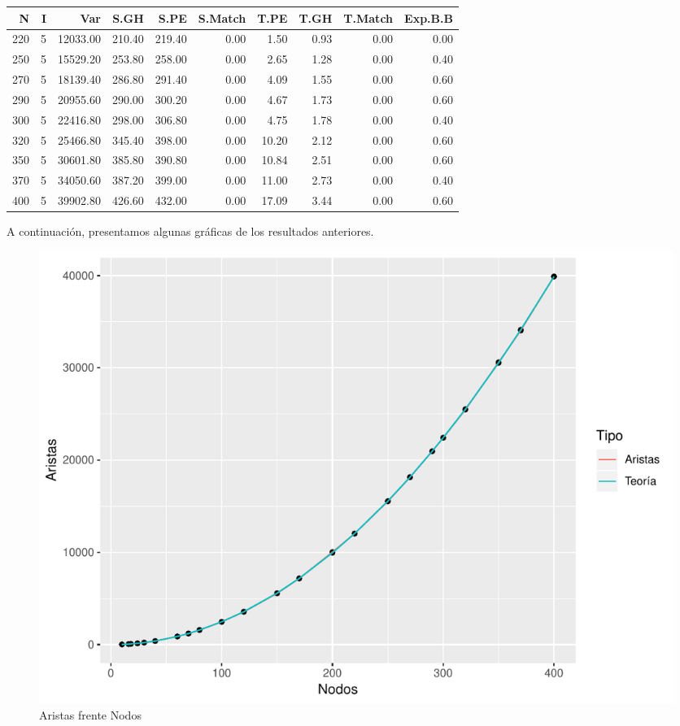 \documentclass[twoside,a4paper,openright,12pt,tikz]{book}
\begin{document}
\begin{table}[h]
\centering
\begin{tabular}{rrrrrrrrrr}
  \hline
N & I & Var & S.GH & S.PE & S.Match & T.PE & T.GH & T.Match & Exp.B.B \\ 
  \hline 
  220 &   5 & 12033.00 & 210.40 & 219.40 & 0.00 & 1.50 & 0.93 & 0.00 & 0.00 \\ 
  250 &   5 & 15529.20 & 253.80 & 258.00 & 0.00 & 2.65 & 1.28 & 0.00 & 0.40 \\ 
  270 &   5 & 18139.40 & 286.80 & 291.40 & 0.00 & 4.09 & 1.55 & 0.00 & 0.60 \\ 
290 &     5 & 20955.60 & 290.00 & 300.20 & 0.00 & 4.67 & 1.73 & 0.00 & 0.60 \\ 
  300 &   5 & 22416.80 & 298.00 & 306.80 & 0.00 & 4.75 & 1.78 & 0.00 & 0.40 \\ 
320 &   5   & 25466.80 & 345.40 & 398.00 & 0.00 & 10.20 & 2.12 & 0.00 & 0.60\\
  350 &   5 & 30601.80 & 385.80 & 390.80 & 0.00 & 10.84 & 2.51 & 0.00 & 0.60\\
  370 &   5 & 34050.60 & 387.20 & 399.00 & 0.00 & 11.00 & 2.73 & 0.00 & 0.40\\
  400 &   5 & 39902.80 & 426.60 & 432.00 & 0.00 & 17.09 & 3.44 & 0.00 & 0.60 \\ 
   \hline
 
\end{tabular}
\end{table}
\newpage
A continuación, presentamos algunas gráficas de los resultados anteriores.
\begin{figure}[h]
\centering
\includegraphics[scale=0.75]{plot1}
\caption{Aristas frente Nodos}
\end{figure}
\end{document}
